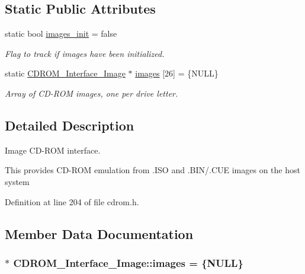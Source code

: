 \subsection*{Static Public Attributes}
\begin{DoxyCompactItemize}
\item 
static bool \hyperlink{classCDROM__Interface__Image_a901be8d60520cf91bcabeb67a808c644}{images\-\_\-init} = false
\begin{DoxyCompactList}\small\item\em Flag to track if images have been initialized. \end{DoxyCompactList}\item 
static \hyperlink{classCDROM__Interface__Image}{C\-D\-R\-O\-M\-\_\-\-Interface\-\_\-\-Image} $\ast$ \hyperlink{classCDROM__Interface__Image_a547a33f528bf5f50063af1def199a7a3}{images} \mbox{[}26\mbox{]} = \{N\-U\-L\-L\}
\begin{DoxyCompactList}\small\item\em Array of C\-D-\/\-R\-O\-M images, one per drive letter. \end{DoxyCompactList}\end{DoxyCompactItemize}


\subsection{Detailed Description}
Image C\-D-\/\-R\-O\-M interface. 

This provides C\-D-\/\-R\-O\-M emulation from .I\-S\-O and .B\-I\-N/.C\-U\-E images on the host system 

Definition at line 204 of file cdrom.\-h.



\subsection{Member Data Documentation}
\hypertarget{classCDROM__Interface__Image_a547a33f528bf5f50063af1def199a7a3}{
\subsubsection[{images}]{ $\ast$ {\bf C\-D\-R\-O\-M\-\_\-\-Interface\-\_\-\-Image\-::images} = \{N\-U\-L\-L\}}}\label{classCDROM__Interface__Image_a547a33f528bf5f50063af1def199a7a3}


